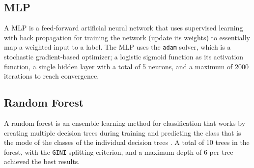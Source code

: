 \subsection{MLP}

A MLP is a feed-forward artificial neural network that uses supervised learning with back propagation for training the network (update its weights) to essentially map a weighted input to a label. The MLP uses the \texttt{adam} solver, which is a stochastic gradient-based optimizer; a logistic sigmoid function as its activation function, a single hidden layer with a total of 5 neurons, and a maximum of 2000 iterations to reach convergence.

\subsection{Random Forest}

A random forest is an ensemble learning method for classification that works by creating multiple decision trees during training and predicting the class that is the mode of the classes of the individual decision trees \cite{data-mining-intro}. A total of 10 trees in the forest, with the \texttt{GINI} splitting criterion, and a maximum depth of 6 per tree achieved the best results.
